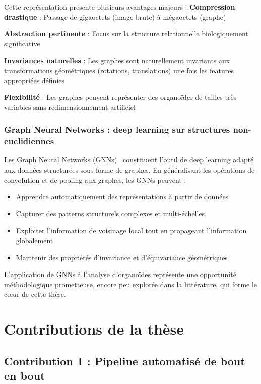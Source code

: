 Cette représentation présente plusieurs avantages majeurs :
\textbf{Compression drastique} : Passage de gigaoctets (image brute) à mégaoctets (graphe)

\textbf{Abstraction pertinente} : Focus sur la structure relationnelle biologiquement significative

\textbf{Invariances naturelles} : Les graphes sont naturellement invariants aux transformations géométriques (rotations, translations) une fois les features appropriées définies

\textbf{Flexibilité} : Les graphes peuvent représenter des organoïdes de tailles très variables sans redimensionnement artificiel

\subsubsection{Graph Neural Networks : deep learning sur structures non-euclidiennes}

Les Graph Neural Networks (GNNs)~\cite{Wu2021,Zhou2020,Battaglia2018} constituent l'outil de deep learning adapté aux données structurées sous forme de graphes. En généralisant les opérations de convolution et de pooling aux graphes, les GNNs peuvent :
\begin{itemize}
    \item Apprendre automatiquement des représentations à partir de données
    \item Capturer des patterns structurels complexes et multi-échelles
    \item Exploiter l'information de voisinage local tout en propageant l'information globalement
    \item Maintenir des propriétés d'invariance et d'équivariance géométriques
\end{itemize}

L'application de GNNs à l'analyse d'organoïdes représente une opportunité méthodologique prometteuse, encore peu explorée dans la littérature, qui forme le cœur de cette thèse.

\section{Contributions de la thèse}

\subsection{Contribution 1 : Pipeline automatisé de bout en bout}


